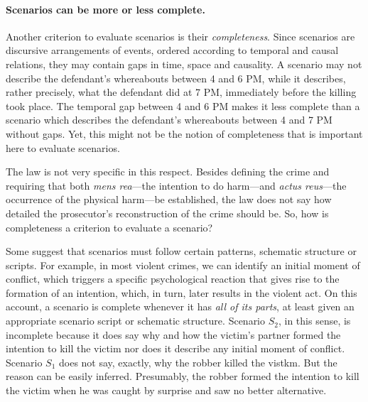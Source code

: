 \documentclass[10pt]{article}
\begin{document}
\paragraph{Scenarios can be more or less complete.}

Another criterion to evaluate scenarios is their \textit{completeness}. Since scenarios are discursive arrangements of events, ordered according to 
temporal and causal relations, they may contain gaps in time, space and causality. A scenario may not describe the defendant's whereabouts between 4 and 6 PM, 
while it describes, rather precisely, what the defendant did at 7 PM, immediately before the killing took place. The temporal gap between 4 and 6 PM 
makes it less complete than a scenario which describes the defendant's whereabouts between 4 and 7 PM without gaps. 
Yet, this might not be the notion of completeness that is important here to evaluate scenarios. 


The law is not very specific in this respect. 
Besides defining the crime and requiring that both \textit{mens rea}---the
 intention to do harm---and \textit{actus reus}---the occurrence of the physical harm---be established, the law does 
 not say how detailed the prosecutor's reconstruction of the crime should be. 
So, how is completeness a criterion to evaluate a scenario? 

Some suggest that scenarios must follow certain patterns, 
schematic structure or scripts. For example, in most violent crimes, we can identify an initial 
moment of conflict, which triggers a specific psychological reaction that gives rise to the formation of an 
intention, which, in turn, later results in the violent act. On this account, a scenario is 
complete whenever it has \textit{all of its parts}, at least given an appropriate 
scenario script or schematic structure. Scenario $S_2$, in this sense, is incomplete 
because it does say why and how the victim's partner formed 
the intention to kill the victim nor does it describe any initial moment of conflict. 
Scenario $S_1$ does not say, exactly, why the robber killed the vistkm. But the reason can be easily inferred. Presumably, 
the robber formed the intention to kill the victim when he was caught by surprise and saw no better alternative. 
\end{document}
